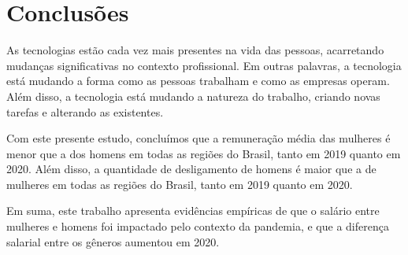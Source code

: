\section{Conclusões}

As tecnologias estão cada vez mais presentes na vida das pessoas, acarretando mudanças significativas no contexto profissional. Em outras palavras, a tecnologia está mudando a forma como as pessoas trabalham e como as empresas operam. Além disso, a tecnologia está mudando a natureza do trabalho, criando novas tarefas e alterando as existentes.

Com este presente estudo, concluímos que a remuneração média das mulheres é menor que a dos homens em todas as regiões do Brasil, tanto em 2019 quanto em 2020. Além disso, a quantidade de desligamento de homens é maior que a de mulheres em todas as regiões do Brasil, tanto em 2019 quanto em 2020.

Em suma, este trabalho apresenta evidências empíricas de que o salário entre mulheres e homens foi impactado pelo contexto da pandemia, e que a diferença salarial entre os gêneros aumentou em 2020.